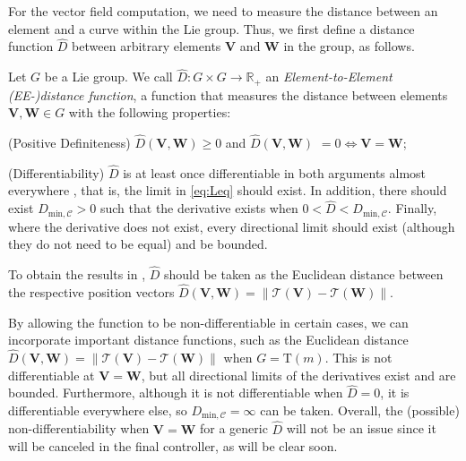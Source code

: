 For the vector field computation, we need to measure the distance between an element and a curve within the Lie group. Thus, we first define a distance function $\widehat{D}$ between arbitrary elements $\mathbf{V}$ and $\mathbf{W}$ in the group, as follows.
\begin{definition}\label{def:distance-D-hat-arbitrary-elements}
    Let $G$ be a Lie group. We call $\widehat{D}:G\times G\to \mathbb{R}_+$ an \emph{Element-to-Element} \emph{(EE-)distance function}, a function that measures the distance between elements $\mathbf{V}, \mathbf{W}\in G$ with the following properties: 
    \begin{property}
        \item (Positive Definiteness) $\widehat{D}(\mathbf{V}, \mathbf{W}) \ge 0$ and $\widehat{D}(\mathbf{V}, \mathbf{W})$ $= 0 \iff \mathbf{V}=\mathbf{W}$;\label{prop:Dhat-positive-definite}
        \item (Differentiability) $\widehat{D}$ is at least once differentiable in both arguments almost everywhere \label{prop:Dhat-differentiability}, that is, the limit in \eqref{eq:Leq} should exist. In addition, there should exist $D_{\text{min},\mathcal{C}}>0$ such that the derivative exists when $0 < \widehat{D} < D_{\text{min},\mathcal{C}}$. Finally, where the derivative does not exist, every directional limit should exist (although they do not need to be equal) and be bounded.
    \end{property}
\end{definition}

\begin{example}\label{ex:adriano-distance-function}
    To obtain the results in \citet{Rezende2022}, $\widehat{D}$ should be taken as the Euclidean distance between the respective position vectors $\widehat{D}(\mathbf{V}, \mathbf{W}) = \|\mathcal{T}(\mathbf{V}) - \mathcal{T}(\mathbf{W})\|$. 
\end{example}

By allowing the function to be non-differentiable in certain cases, we can incorporate important distance functions, such as the Euclidean distance $\widehat{D}(\mathbf{V},\mathbf{W}) = \|\mathcal{T}(\mathbf{V}) - \mathcal{T}(\mathbf{W})\|$ when $G=\text{T}(m)$. This  is not differentiable at $\mathbf{V}=\mathbf{W}$, but all directional limits of the derivatives exist and are bounded. Furthermore, although it is not differentiable when $\widehat{D}=0$, it is differentiable everywhere else, so $D_{\text{min},\mathcal{C}} = \infty$ can be taken. Overall, the (possible) non-differentiability when $\mathbf{V}=\mathbf{W}$  for a generic $\widehat{D}$ will not be an issue since it will be canceled in the final controller, as will be clear soon.

